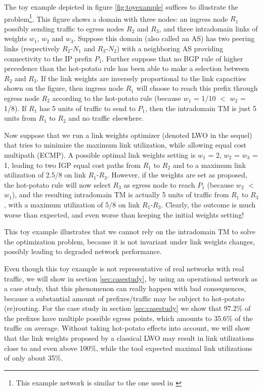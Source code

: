 \documentclass{acm_proc_article-sp}
\begin{document}
The toy example depicted in figure \ref{fig:toyexample} suffices to
illustrate the problem\footnote{This example network is similar to the
one used in \cite{selin}}. This figure shows a domain with three nodes:
an ingress node $R_1$ possibly sending traffic to egress nodes $R_2$ and
$R_3$, and three intradomain links of weights $w_1$, $w_2$ and $w_3$. Suppose
this domain (also called an AS) has two peering links (respectively
$R_2$-$N_1$ and $R_3$-$N_2$) with a neighboring AS providing connectivity to
the IP prefix $P_1$. Further suppose that no BGP rule of higher
precedence than the hot-potato rule has been able to make a selection
between $R_2$ and $R_3$. If the link weights are inversely proportional to
the link capacities shown on the figure, then ingress node $R_1$ will
choose to reach this prefix through egress node $R_2$ according to the
hot-potato rule (because $w_1$ = 1/10 $<$ $w_2$ = 1/8). If $R_1$ has 5 units
of traffic to send to $P_1$, then the intradomain TM is just 5 units
from $R_1$ to $R_2$ and no traffic elsewhere. 

Now suppose that we run a link weights optimizer (denoted LWO in the sequel) that tries to
minimize the maximum link utilization, while allowing equal cost
multipath (ECMP)\cite{OSPF}. A possible optimal link weights setting
is {$w_1$ = 2, $w_2$ = $w_3$ = 1}, leading to two IGP equal cost paths from
$R_1$ to $R_2$ and to a maximum link utilization of 2.5/8 on link
$R_1$-$R_3$. However, if the weights are set as proposed, the hot-potato
rule will now select $R_3$ as egress node to reach $P_1$ (because $w_2$ $<$
$w_1$), and the resulting intradomain TM is actually 5 units of traffic
from $R_1$ to $R_3$, with a maximum utilization of 5/8 on link
$R_1$-$R_3$. Clearly, the outcome is much worse than expected, and even
worse than keeping the initial weights setting! 

This toy example illustrates that we cannot rely on the intradomain TM
to solve the optimization problem, because it is not invariant under
link weights changes, possibly leading to degraded network
performance. 

Even though this toy example is not representative of real networks
with real traffic, we will show in section \ref{sec:casestudy}, by using an operational
network as a case study, that this phenomenon can really happen with
bad consequences, because a substantial
amount of prefixes/traffic may be subject to hot-potato (re)routing. 
For the case study in section \ref{sec:casestudy} we show that 97.2\% of the prefixes
have multiple possible egress points, which amounts to 35.6\% of the traffic
on average. Without taking hot-potato effects into account, we will show that the link
weights proposed by a classical LWO 
may result in link utilizations close to and even above 100\%,
while the tool expected maximal 
link utilizations of only about 35\%.
\end{document}
